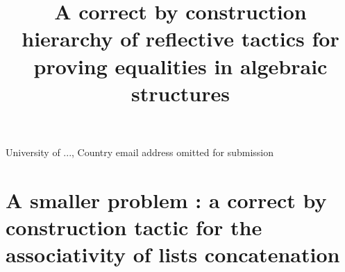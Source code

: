 \documentclass{sigplanconf}
\begin{document}
\setlength{\pdfpageheight}{\paperheight}
\setlength{\pdfpagewidth}{\paperwidth}









\title{A correct by construction hierarchy of reflective tactics for proving equalities in algebraic structures}

           {University of ..., Country}
           {email address omitted for submission}



\maketitle

\nocite{*}










         
\section {A smaller problem : a correct by construction tactic for the associativity of lists concatenation}
\end{document}

